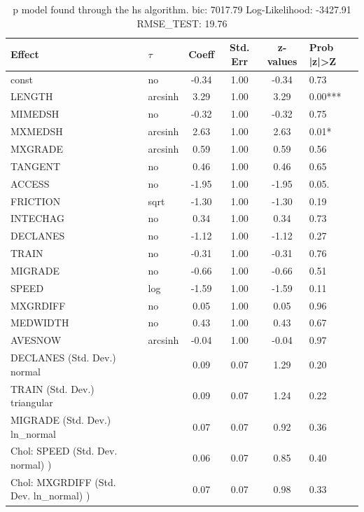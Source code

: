 \begin{table}
	\caption{p model found through the hs algorithm. bic: 7017.79 Log-Likelihood: -3427.91 RMSE_TEST: 19.76}
	\begin{center}
		\begin{tabular}{|l|l|c|c|c|l|}
			\hline
			Effect & $\tau$ & Coeff & Std. Err & z-values & Prob |z|>Z \\
			\hline
			const & no & -0.34 & 1.00 & -0.34 & 0.73 \\
			\hline
			LENGTH & arcsinh & 3.29 & 1.00 & 3.29 & 0.00*** \\
			\hline
			MIMEDSH & no & -0.32 & 1.00 & -0.32 & 0.75 \\
			\hline
			MXMEDSH & arcsinh & 2.63 & 1.00 & 2.63 & 0.01* \\
			\hline
			MXGRADE & arcsinh & 0.59 & 1.00 & 0.59 & 0.56 \\
			\hline
			TANGENT & no & 0.46 & 1.00 & 0.46 & 0.65 \\
			\hline
			ACCESS & no & -1.95 & 1.00 & -1.95 & 0.05. \\
			\hline
			FRICTION & sqrt & -1.30 & 1.00 & -1.30 & 0.19 \\
			\hline
			INTECHAG & no & 0.34 & 1.00 & 0.34 & 0.73 \\
			\hline
			DECLANES & no & -1.12 & 1.00 & -1.12 & 0.27 \\
			\hline
			TRAIN & no & -0.31 & 1.00 & -0.31 & 0.76 \\
			\hline
			MIGRADE & no & -0.66 & 1.00 & -0.66 & 0.51 \\
			\hline
			SPEED & log & -1.59 & 1.00 & -1.59 & 0.11 \\
			\hline
			MXGRDIFF & no & 0.05 & 1.00 & 0.05 & 0.96 \\
			\hline
			MEDWIDTH & no & 0.43 & 1.00 & 0.43 & 0.67 \\
			\hline
			AVESNOW & arcsinh & -0.04 & 1.00 & -0.04 & 0.97 \\
			\hline
			DECLANES (Std. Dev.) normal &  & 0.09 & 0.07 & 1.29 & 0.20 \\
			\hline
			TRAIN (Std. Dev.) triangular &  & 0.09 & 0.07 & 1.24 & 0.22 \\
			\hline
			MIGRADE (Std. Dev.) ln_normal &  & 0.07 & 0.07 & 0.92 & 0.36 \\
			\hline
			 Chol: SPEED (Std. Dev. normal) ) &  & 0.06 & 0.07 & 0.85 & 0.40 \\
			\hline
			 Chol: MXGRDIFF (Std. Dev. ln_normal) ) &  & 0.07 & 0.07 & 0.98 & 0.33 \\
			\hline

\end{tabular}
\end{center}
\end{table}
